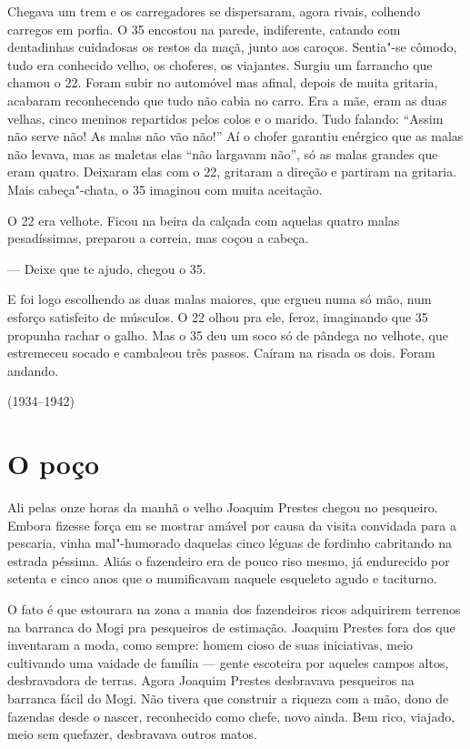 Chegava um trem e os carregadores se dispersaram, agora rivais, colhendo
carregos em porfia. O 35 encostou na parede, indiferente, catando com
dentadinhas cuidadosas os restos da maçã, junto aos caroços. Sentia"-se
cômodo, tudo era conhecido velho, os choferes, os viajantes. Surgiu um
farrancho que chamou o 22. Foram subir no automóvel mas afinal, depois
de muita gritaria, acabaram reconhecendo que tudo não cabia no carro.
Era a mãe, eram as duas velhas, cinco meninos repartidos pelos colos e o
marido. Tudo falando: ``Assim não serve não! As malas não vão não!'' Aí
o chofer garantiu enérgico que as malas não levava, mas as maletas elas
``não largavam não'', só as malas grandes que eram quatro. Deixaram elas
com o 22, gritaram a direção e partiram na gritaria. Mais cabeça"-chata,
o 35 imaginou com muita aceitação.

O 22 era velhote. Ficou na beira da calçada com aquelas quatro malas
pesadíssimas, preparou a correia, mas coçou a cabeça.

--- Deixe que te ajudo, chegou o 35.

E foi logo escolhendo as duas malas maiores, que ergueu numa só mão, num
esforço satisfeito de músculos. O 22 olhou pra ele, feroz, imaginando
que 35 propunha rachar o galho. Mas o 35 deu um soco só de pândega no
velhote, que estremeceu socado e cambaleou três passos. Caíram na risada
os dois. Foram andando.

\bigskip

\hfill{}(1934--1942)

\chapter{O poço}

Ali pelas onze horas da manhã o velho Joaquim Prestes chegou no
pesqueiro. Embora fizesse força em se mostrar amável por causa da visita
convidada para a pescaria, vinha mal"-humorado daquelas cinco léguas de
fordinho cabritando na estrada péssima. Aliás o fazendeiro era de pouco
riso mesmo, já endurecido por setenta e cinco anos que o mumificavam
naquele esqueleto agudo e taciturno.

O fato é que estourara na zona a mania dos fazendeiros ricos adquirirem
terrenos na barranca do Mogi pra pesqueiros de estimação. Joaquim
Prestes fora dos que inventaram a moda, como sempre: homem cioso de suas
iniciativas, meio cultivando uma vaidade de família --- gente escoteira
por aqueles campos altos, desbravadora de terras. Agora Joaquim Prestes
desbravava pesqueiros na barranca fácil do Mogi. Não tivera que
construir a riqueza com a mão, dono de fazendas desde o nascer,
reconhecido como chefe, novo ainda. Bem rico, viajado, meio sem
quefazer, desbravava outros matos.


